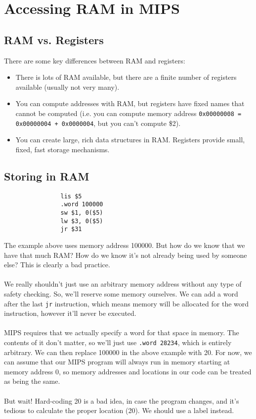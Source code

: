 \documentclass[]{article}
\theoremstyle{definition}
\begin{document}
	\section{Accessing RAM in MIPS}
		\subsection{RAM vs. Registers}
			There are some key differences between RAM and registers:
			\begin{itemize}
				\item There is lots of RAM available, but there are a finite number of registers available (usually not very many).
				\item You can compute addresses with RAM, but registers have fixed names that cannot be computed (i.e. you can compute memory address \verb|0x00000008 = 0x00000004 + 0x0000004|, but you can't compute \$2).
				\item You can create large, rich data structures in RAM. Registers provide small, fixed, fast storage mechanisms.
			\end{itemize}
		\subsection{Storing in RAM}
			\begin{verbatim}
				lis $5
				.word 100000
				sw $1, 0($5)
				lw $3, 0($5)
				jr $31
			\end{verbatim}
			
			The example above uses memory address 100000. But how do we know that we have that much RAM? How do we know it's not already being used by someone else? This is clearly a bad practice.
			\\ \\
			We really shouldn't just use an arbitrary memory address without any type of safety checking. So, we'll reserve some memory ourselves. We can add a word after the last \verb+jr+ instruction, which means memory will be allocated for the word instruction, however it'll never be executed.
			\\ \\
			MIPS requires that we actually specify a word for that space in memory. The contents of it don't matter, so we'll just use \verb+.word 28234+, which is entirely arbitrary. We can then replace 100000 in the above example with 20. For now, we can assume that our MIPS program will always run in memory starting at memory address 0, so memory addresses and locations in our code can be treated as being the same.
			\\ \\
			But wait! Hard-coding 20 is a bad idea, in case the program changes, and it's tedious to calculate the proper location (20). We should use a label instead.
\end{document}
